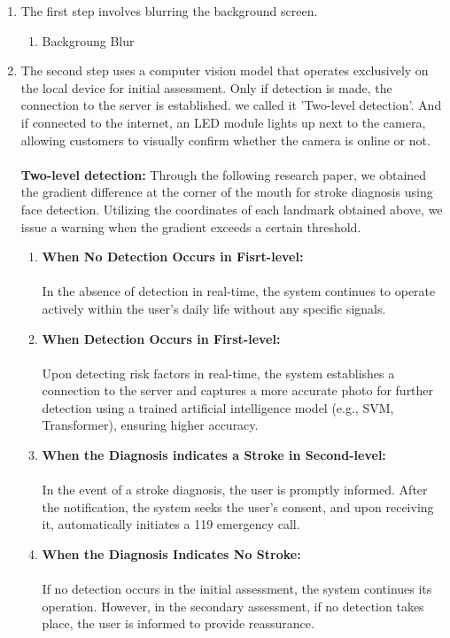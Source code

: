 \begin{enumerate}
    \item The first step involves blurring the background screen.
    \begin{enumerate}
    \item Backgroung Blur\\
    \end{enumerate}
    
    \item The second step uses a computer vision model that operates exclusively on the local device for initial assessment. Only if detection is made, the connection to the server is established. we called it 'Two-level detection'.
And if connected to the internet, an LED module lights up next to the camera, allowing customers to visually confirm whether the camera is online or not.\\
\\
    \textbf{Two-level detection:}
    \cite{gradient} Through the following research paper, we obtained the gradient difference at the corner of the mouth for stroke diagnosis using face detection. Utilizing the coordinates of each landmark obtained above, we issue a warning when the gradient exceeds a certain threshold.\\
    
    \begin{enumerate}
    \item \textbf{When No Detection Occurs in Fisrt-level:}\\
\\In the absence of detection in real-time, the system continues to operate actively within the user's daily life without any specific signals.\\
\item \textbf{When Detection Occurs in First-level:}\\
\\Upon detecting risk factors in real-time, the system establishes a connection to the server and captures a more accurate photo for further detection using a trained artificial intelligence model (e.g., SVM, Transformer), ensuring higher accuracy.\\
\item \textbf{When the Diagnosis indicates a Stroke in Second-level:}\\
\\In the event of a stroke diagnosis, the user is promptly informed.
After the notification, the system seeks the user's consent, and upon receiving it, automatically initiates a 119 emergency call.\\
\item \textbf{When the Diagnosis Indicates No Stroke:}\\
\\If no detection occurs in the initial assessment, the system continues its operation. However, in the secondary assessment, if no detection takes place, the user is informed to provide reassurance.

    \end{enumerate}
\end{enumerate}